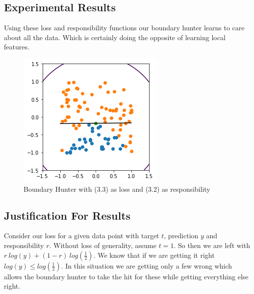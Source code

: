 \documentclass[notitlepage]{report}
\theoremstyle{definition}
\begin{document}
\subsection{Experimental Results}
Using these loss and responsibility functions our boundary hunter learns to care about all the data. Which is certainly doing the opposite of learning local features.

\begin{figure}[H]
\centering
  \begin{minipage}[b]{0.4\textwidth}
    \includegraphics[width=\textwidth]{BoundaryHunter-Attempt1-01.png}
    \caption{Boundary Hunter with (3.3) as loss and (3.2) as responsibility}
  \end{minipage}
  \hfill
\end{figure}

\subsection{Justification For Results}
Consider our loss for a given data point with target $t$, prediction $y$ and responsibility $r$. Without loss of generality, assume $t = 1$. So then we are left with $r\ log(y) + (1-r)\ log(\frac{1}{2})$. We know that if we are getting it right $log(y) \leq log(\frac{1}{2})$. In this situation we are getting only a few wrong which allows the boundary hunter to take the hit for these while getting everything else right.
\end{document}
